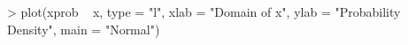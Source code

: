 \begin{Schunk}
\begin{Sinput}
> plot(xprob ~ x, type = "l", xlab = "Domain of x", ylab = "Probability Density", main = "Normal")
\end{Sinput}
\end{Schunk}
